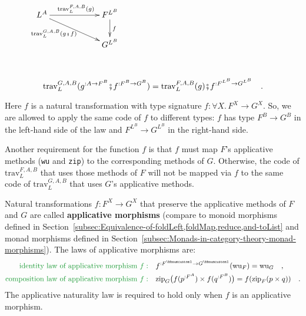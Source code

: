 \begin{wrapfigure}{l}{0.26\columnwidth}%
\vspace{-1.3\baselineskip}
$\xymatrix{\xyScaleY{1.7pc}\xyScaleX{5.0pc}L^{A}\ar[rd]\sb(0.4){\text{trav}_{L}^{G,A,B}(g\bef f)~~}\ar[r]\sp(0.5){\text{trav}_{L}^{F,A,B}(g)} & F^{L^{B}}\ar[d]\sp(0.45){f}\\
 & G^{L^{B}}
}
$\vspace{0.5\baselineskip}
\end{wrapfigure}%

~\vspace{-1.5\baselineskip}

\begin{equation}
\text{trav}_{L}^{G,A,B}(g^{:A\rightarrow F^{B}}\bef f^{:F^{B}\rightarrow G^{B}})=\text{trav}_{L}^{F,A,B}(g)\bef f^{:F^{L^{B}}\rightarrow G^{L^{B}}}\quad.\label{eq:traverse-applicative-naturality-law}
\end{equation}

\noindent Here $f$ is a natural transformation with type signature
$f:\forall X.\,F^{X}\rightarrow G^{X}$. So, we are allowed to apply
the same code of $f$ to different types: $f$ has type $F^{B}\rightarrow G^{B}$
in the left-hand side of the law and $F^{L^{B}}\rightarrow G^{L^{B}}$
in the right-hand side.

Another requirement for the function $f$ is that $f$ must map $F$\textsf{'}s
applicative methods (\lstinline!wu! and \lstinline!zip!) to the
corresponding methods of $G$. Otherwise, the code of $\text{trav}_{L}^{F,A,B}$
that uses those methods of $F$ will not be mapped via $f$ to the
same code of $\text{trav}_{L}^{G,A,B}$ that uses $G$\textsf{'}s applicative
methods. 

Natural transformations $f:F^{X}\rightarrow G^{X}$ that preserve
the applicative methods of $F$ and $G$ are called \textbf{applicative
morphisms} (compare to monoid morphisms defined in Section~\ref{subsec:Equivalence-of-foldLeft,foldMap,reduce,and-toList}
and monad morphisms defined in Section~\ref{subsec:Monads-in-category-theory-monad-morphisms}).
The laws of applicative morphisms are:
\begin{align}
{\color{greenunder}\text{identity law of applicative morphism }f:}\quad & f^{:F^{\bbnum 1}\rightarrow G^{\bbnum 1}}(\text{wu}_{F})=\text{wu}_{G}\quad,\label{eq:identity-law-of-applicative-morphism}\\
{\color{greenunder}\text{composition law of applicative morphism }f:}\quad & \text{zip}_{G}\big(f(p^{:F^{A}})\times f(q^{:F^{B}})\big)=f(\text{zip}_{F}(p\times q))\quad.\label{eq:composition-law-of-applicative-morphism}
\end{align}
The applicative naturality law is required to hold only when $f$
is an applicative morphism.


